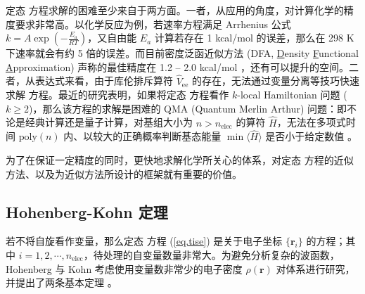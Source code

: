 定态 \Schrodinger 方程求解的困难至少来自于两方面。一者，从应用的角度，对计算化学的精度要求非常高。以化学反应为例，若速率方程满足 Arrhenius 公式 $k = A \exp (- \frac{E_\mathrm{a}}{R T})$，又自由能 $E_a$ 计算若存在 1 kcal/mol 的误差，那么在 298 K 下速率就会有约 5 倍的误差。而目前密度泛函近似方法 (DFA, \underline{D}ensity \underline{F}unctional \underline{A}pproximation) 声称的最佳精度在 1.2 -- 2.0 kcal/mol \cite{Zhang-Xu.JPCL.2021, Santra-Martin.JPCL.2021}，还有可以提升的空间。二者，从表达式来看，由于库伦排斥算符 $\hat V_\mathrm{ee}$ 的存在，无法通过变量分离等技巧快速求解 \Schrodinger 方程。最近的研究表明，如果将定态 \Schrodinger 方程看作 $k$-local Hamiltonian 问题 ($k \geq 2$)，那么该方程的求解是困难的 QMA (Quantum Merlin Arthur) 问题：即不论是经典计算还是量子计算，对基组大小为 $n > n_\mathrm{elec}$ 的算符 $\hat H$，无法在多项式时间 $\mathrm{poly}(n)$ 内、以较大的正确概率判断基态能量 $\min \langle \hat H \rangle$ 是否小于给定数值 \cite{Kempe-Regev.SJC.2006}。

为了在保证一定精度的同时，更快地求解化学所关心的体系，对定态 \Schrodinger 方程的近似方法、以及为近似方法所设计的框架就有重要的价值。

\subsection{Hohenberg-Kohn 定理}

若不将自旋看作变量，那么定态 \Schrodinger 方程 (\ref{eq.tise}) 是关于电子坐标 $\{\bm{r}_i\}$ 的方程；其中 $i = 1, 2, \cdots, n_\mathrm{elec}$，待处理的自变量数量非常大。为避免分析复杂的波函数，Hohenberg 与 Kohn 考虑使用变量数非常少的电子密度 $\rho(\bm{r})$ 对体系进行研究，并提出了两条基本定理 \cite{Hohenberg-Kohn.PR.1964}。

